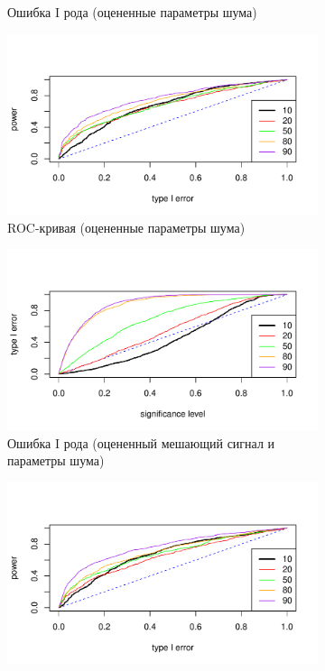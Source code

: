 \documentclass[specialist,
substylefile = spbu_report.rtx,
subf,href,colorlinks=true, 12pt]{disser}
\theoremstyle{definition}
\begin{document}
\begin{figure}[h!]
\begin{subfigure}[t]{0.5\textwidth}
		\caption{Ошибка I рода (оцененные параметры шума)}
		\label{fig:sin_est_noise_type1error}
	\end{subfigure}\hspace{\fill}
	\begin{subfigure}[t]{0.5\textwidth}
		\centering
		\includegraphics[width=\textwidth]{img/roc_sin_est_noise.pdf}
		\caption{ROC-кривая (оцененные параметры шума)}
		\label{fig:sin_est_noise_roc}
	\end{subfigure}
	\begin{subfigure}[t]{0.5\textwidth}
		\centering
		\includegraphics[width=\textwidth]{img/type1error_sin_est_noise_signal.pdf}
		\caption{Ошибка I рода (оцененный мешающий сигнал и параметры шума)}
		\label{fig:sin_est_noise_signal_type1error}
	\end{subfigure}\hspace{\fill}
	\begin{subfigure}[t]{0.5\textwidth}
		\centering
		\includegraphics[width=\textwidth]{img/roc_sin_est_noise_signal.pdf}

\end{subfigure}
\end{figure}
\end{document}
